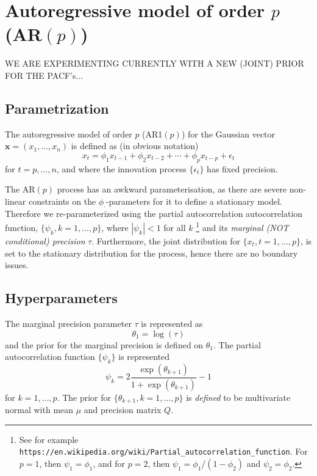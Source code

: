 \documentclass[a4paper,11pt]{article}
\begin{document}
\section*{Autoregressive model of order $p$ (AR$(p)$)}

WE ARE EXPERIMENTING CURRENTLY WITH A NEW (JOINT) PRIOR FOR THE PACF's...


\subsection*{Parametrization}

The autoregressive model of order $p$ (AR1$(p)$) for the Gaussian vector
$\mathbf{x}=(x_1,\dots,x_n)$ is defined as (in obvious notation)
\begin{displaymath}
    x_{t} = \phi_{1}x_{t-1} + \phi_{2}x_{t-2} + \cdots + \phi_{p}
    x_{t-p} + \epsilon_{t}
\end{displaymath}
for $t = p, \ldots, n$, and where the innovation process
$\{\epsilon_{t}\}$ has fixed precision.

The AR$(p)$ process has an awkward parameterisation, as there are
severe non-linear constraints on the $\phi_{\cdot}$-parameters for it
to define a stationary model. Therefore we re-parameterized using the
partial autocorrelation autocorrelation function, $\{\psi_{k}, k=1,
\ldots, p\}$, where $|\psi_{k}|< 1$ for all $k$ \footnote{See for
    example
    \texttt{https://en.wikipedia.org/wiki/Partial\_autocorrelation\_function}.
    For $p=1$, then $\psi_{1} = \phi_{1}$, and for $p=2$, then
    $\psi_{1} = \phi_{1}/(1-\phi_{2})$ and $\psi_{2} = \phi_{2}$.}
and its \emph{marginal (NOT conditional) precision}
$\tau$. Furthermore, the joint distribution for $\{x_{t}, t=1, \ldots,
p\}$, is set to the stationary distribution for the process, hence
there are no boundary issues.

\subsection*{Hyperparameters}

The marginal precision parameter $\tau$ is represented as
\begin{displaymath}
    \theta_1 =\log(\tau) 
\end{displaymath}
and the prior for the marginal precision is defined on
$\theta_{1}$. The partial autocorrelation function $\{\psi_{k}\}$ is
represented
\begin{displaymath}
    \psi_{k} = 2\frac{\exp(\theta_{k+1})}{1+\exp(\theta_{k+1})} -1
\end{displaymath}
for $k = 1, \ldots, p$. The prior for $\{\theta_{k+1}, k=1, \ldots,
p\}$ is \emph{defined} to be multivariate normal with mean $\mu$ and
precision matrix $Q$.
\end{document}
